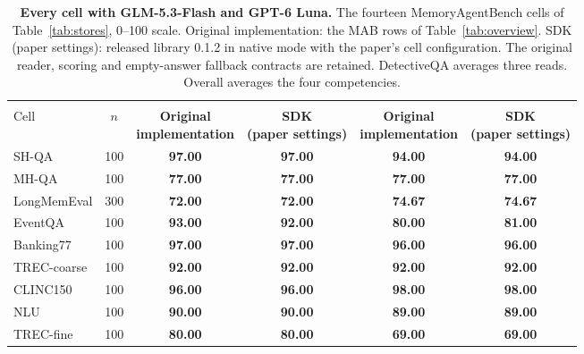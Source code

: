 \documentclass{article}
\newcommand{\tabfont}{\fontsize{7.5}{8.5}\selectfont\renewcommand{\arraystretch}{1.0}}
\begin{document}
\begin{table}[!htbp]
\centering\tabfont
\caption{\textbf{Every cell with GLM-5.3-Flash and GPT-6 Luna.} The fourteen MemoryAgentBench cells of Table~\ref{tab:stores}, 0--100 scale. Original implementation: the MAB rows of Table~\ref{tab:overview}. SDK (paper settings): released library 0.1.2 in native mode with the paper's cell configuration. The original reader, scoring and empty-answer fallback contracts are retained. DetectiveQA averages three reads. Overall averages the four competencies.}
\label{tab:expandedfrontier}
\setlength{\tabcolsep}{4pt}\setlength{\aboverulesep}{0pt}\setlength{\belowrulesep}{0pt}\setlength{\extrarowheight}{0.8pt}
\begin{tabular}{lc>{\columncolor{oursbg}}c>{\columncolor{oursbg}}c>{\columncolor{oursbg}}c>{\columncolor{oursbg}}c}
\toprule
 & & \multicolumn{2}{>{\columncolor{oursbg}}c}{GLM-5.3-Flash} & \multicolumn{2}{>{\columncolor{oursbg}}c}{GPT-6 Luna} \\
\cmidrule(lr){3-4}\cmidrule(lr){5-6}
Cell & $n$ & \shortstack{\textbf{Original}\\\textbf{implementation}} & \shortstack{\textbf{SDK}\\\textbf{(paper settings)}} & \shortstack{\textbf{Original}\\\textbf{implementation}} & \shortstack{\textbf{SDK}\\\textbf{(paper settings)}} \\
\midrule
SH-QA & 100 & \textbf{97.00} & \textbf{97.00} & \textbf{94.00} & \textbf{94.00} \\
MH-QA & 100 & \textbf{77.00} & \textbf{77.00} & \textbf{77.00} & \textbf{77.00} \\
LongMemEval & 300 & \textbf{72.00} & \textbf{72.00} & \textbf{74.67} & \textbf{74.67} \\
EventQA & 100 & \textbf{93.00} & \textbf{92.00} & \textbf{80.00} & \textbf{81.00} \\
Banking77 & 100 & \textbf{97.00} & \textbf{97.00} & \textbf{96.00} & \textbf{96.00} \\
TREC-coarse & 100 & \textbf{92.00} & \textbf{92.00} & \textbf{92.00} & \textbf{92.00} \\
CLINC150 & 100 & \textbf{96.00} & \textbf{96.00} & \textbf{98.00} & \textbf{98.00} \\
NLU & 100 & \textbf{90.00} & \textbf{90.00} & \textbf{89.00} & \textbf{89.00} \\
TREC-fine & 100 & \textbf{80.00} & \textbf{80.00} & \textbf{69.00} & \textbf{69.00} \\

\end{tabular}
\end{table}
\end{document}
